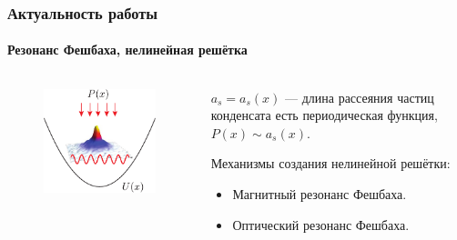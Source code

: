 \documentclass [10pt] {beamer}
\begin{document}
\begin{frame}
	\frametitle{Актуальность работы}
	\framesubtitle{Резонанс Фешбаха, нелинейная решётка}
	
	\begin{columns}[T]
		\begin{column}{.5\textwidth}
			\begin{figure}
				\includegraphics[width=1\textwidth]{pic/nonlinear lattice}
			\end{figure}
		\end{column}
		\begin{column}{.5\textwidth}
			$a_s = a_s(x)$ --- длина рассеяния частиц конденсата есть периодическая функция, $P(x) \sim a_s(x)$.
	
			\vspace{10pt}
	
			Механизмы создания нелинейной решётки:
			\begin{itemize}
				\item Магнитный резонанс Фешбаха. 
				\item Оптический резонанс Фешбаха.
			\end{itemize}
		\end{column}
	\end{columns}
\end{frame}
\end{document}
